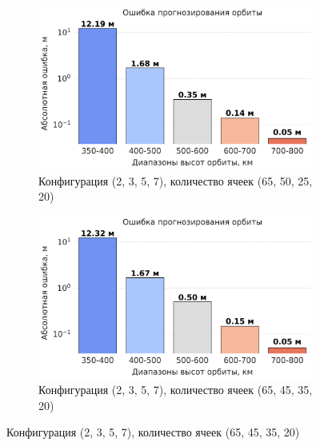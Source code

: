 \begin{figure}[htbp]
    \centering
    
    \begin{subfigure}[b]{0.48\textwidth}
        \includegraphics[width=\linewidth]{../images/solution/atmo/propagation/2357_1.png}
        \caption{Конфигурация (2, 3, 5, 7),
        количество ячеек (65, 50, 25, 20)}
        \label{fig:atmo:2357_propag_1}
    \end{subfigure}
    \hfill
    \begin{subfigure}[b]{0.48\textwidth}
        \includegraphics[width=\linewidth]{../images/solution/atmo/propagation/2357_2.png}
        \caption{Конфигурация (2, 3, 5, 7),
        количество ячеек (65, 45, 35, 20)}
        \label{fig:atmo:2357_propag_2}
    \end{subfigure}
    
    \vspace{0.5cm} %
    

\end{figure}
